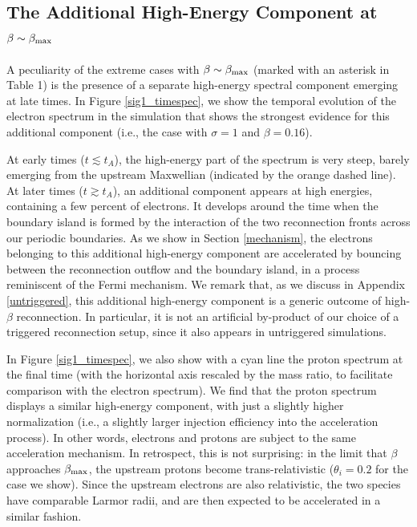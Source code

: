 \subsection{The Additional High-Energy Component at $\beta \sim \beta_{\rm max}$}\label{betamax}
A peculiarity of the extreme cases with $\beta\sim \beta_{\rm max}$ (marked with an asterisk in Table 1) is the presence of a separate high-energy spectral component emerging at late times. In Figure \ref{sig1_timespec}, we show  the temporal evolution of the electron spectrum in the simulation  that shows the strongest evidence for this additional component (i.e., the case with $\sigma=1$ and $\beta=0.16$).  

At early times ($t\lesssim t_{A}$), the high-energy part of the spectrum is very steep, barely emerging from the upstream Maxwellian (indicated by the orange dashed line). At later times ($t\gtrsim t_{A}$), an additional component appears at high energies, containing a few percent of electrons. It develops around the time when the boundary island is formed by the interaction of the two reconnection fronts across our periodic boundaries. As we show in Section \ref{mechanism}, the electrons belonging to this additional high-energy component are accelerated by bouncing between the reconnection outflow and the boundary island, in a process reminiscent of the Fermi mechanism. We remark that, as we discuss in Appendix \ref{untriggered}, this additional high-energy component is a generic outcome of high-$\beta$ reconnection. In particular, it is not an artificial by-product of our choice of a triggered reconnection setup, since it also appears in untriggered simulations. 

In Figure \ref{sig1_timespec}, we also show with a cyan line the proton spectrum at the final time (with the horizontal axis rescaled by the mass ratio, to facilitate comparison with the electron spectrum). We find that the proton spectrum displays a similar high-energy component, with just a slightly higher normalization (i.e., a slightly larger injection efficiency into the acceleration process). In other words,  electrons and protons are subject to the same  acceleration mechanism.
In retrospect, this is not surprising: in the limit that $\beta$ approaches $\beta_{\rm max}$, the upstream protons become trans-relativistic ($\theta_{i}=0.2$ for the case we show). Since the upstream electrons are also relativistic, the two species have comparable Larmor radii, and are then expected to be accelerated in a similar fashion.
 
